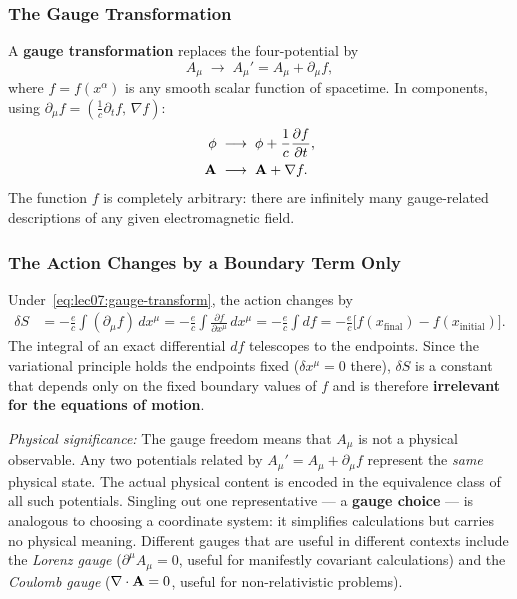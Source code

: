 \subsubsection*{The Gauge Transformation}

A \textbf{gauge transformation} replaces the four-potential by
\begin{equation}\label{eq:lec07:gauge-transform}
    \boxed{A_\mu \;\longrightarrow\; A_\mu' = A_\mu + \partial_\mu f ,}
\end{equation}
where $f = f(x^\alpha)$ is any smooth scalar function of spacetime.  In
components, using $\partial_\mu f = (\tfrac{1}{c}\partial_t f,\,\nabla f)$:
\begin{align}
    \phi  &\;\longrightarrow\; \phi + \frac{1}{c}\frac{\partial f}{\partial t} ,
    \label{eq:lec07:gauge-phi}\\
    \mathbf{A} &\;\longrightarrow\; \mathbf{A} + \nabla f .
    \label{eq:lec07:gauge-A}
\end{align}
The function $f$ is completely arbitrary: there are infinitely many gauge-related
descriptions of any given electromagnetic field.

\subsubsection*{The Action Changes by a Boundary Term Only}

Under~\eqref{eq:lec07:gauge-transform}, the action changes by
\begin{align}
    \delta S
    &= -\frac{e}{c}\int(\partial_\mu f)\,dx^\mu
     = -\frac{e}{c}\int \frac{\partial f}{\partial x^\mu}\,dx^\mu
     = -\frac{e}{c}\int df
     = -\frac{e}{c}\bigl[f(x_{\text{final}}) - f(x_{\text{initial}})\bigr].
    \label{eq:lec07:delta-S}
\end{align}
The integral of an exact differential $df$ telescopes to the endpoints.  Since
the variational principle holds the endpoints fixed ($\delta x^\mu = 0$ there),
$\delta S$ is a constant that depends only on the fixed boundary values of $f$
and is therefore \textbf{irrelevant for the equations of motion}.

\textit{Physical significance:}  The gauge freedom means that $A_\mu$ is not a
physical observable.  Any two potentials related by
$A_\mu' = A_\mu + \partial_\mu f$ represent the \emph{same} physical state.
The actual physical content is encoded in the equivalence class of all such
potentials.  Singling out one representative — a \textbf{gauge choice} — is
analogous to choosing a coordinate system: it simplifies calculations but
carries no physical meaning.  Different gauges that are useful in different
contexts include the \emph{Lorenz gauge} ($\partial^\mu A_\mu = 0$, useful for
manifestly covariant calculations) and the \emph{Coulomb gauge} ($\nabla\cdot\mathbf{A} = 0$,
useful for non-relativistic problems).

